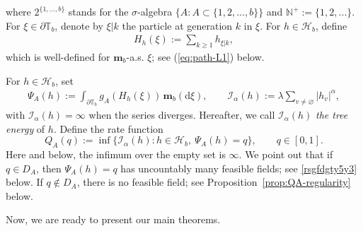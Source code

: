 \documentclass[a4paper, 11pt]{article}
\newcommand{\1}{\mathbf 1}
\theoremstyle{plain}
\begin{document}
where $2^{\{1,\ldots,b\}}$ stands for the $\sigma$-algebra $\{A:A\subset\{1,2,...,b\}\}$ and $\mathbb N^+:=\{1,2,...\}$. For \(\xi\in\partial\mathbb T_b\), denote by $\xi|k$ the particle at generation $k$ in $\xi$. For \(h\in\mathcal{H}_b\), define
\begin{align}\label{5j7u7ugt5}
  H_h(\xi):=\sum_{k\geq1}h_{\xi|k},
\end{align}
which is well-defined for $\mathbf m_b$-a.s. $\xi$; see (\ref{eq:path-L1}) below.

\par
For \(h\in\mathcal{H}_b\), set
\begin{align}\label{5yhyr7u5}
  \Psi_A(h)
  :=
  \int_{\partial\mathbb{T}_b}g_A(H_h(\xi))\,\mathbf m_b(\mathrm{d}\xi),
  \qquad
  \mathcal{I_{\alpha}}(h):=\lambda\sum_{v\neq\varnothing}|h_v|^\alpha,
\end{align}
with \(\mathcal{I_{\alpha}}(h)=\infty\) when the series diverges. Hereafter, we call $\mathcal{I_{\alpha}}(h)$  {\em the tree energy} of $h$. Define the rate function
\begin{equation}\label{eq:QA}
  Q_A(q)
  :=
  \inf\{\mathcal{I_{\alpha}}(h):h\in\mathcal{H}_b,\ \Psi_A(h)=q\},
  \qquad q\in[0,1].
\end{equation}
Here and below, the infimum over the empty set is \(\infty\). We point out that if
\(q\in D_A\),  then $\Psi_A(h)=q$ has uncountably many feasible fields; see \eqref{rsgfdgty5y3} below. If \(q\notin D_A\), there is no feasible field; see Proposition~\ref{prop:QA-regularity} below.
\par
Now, we are ready to present our main theorems.
\end{document}
